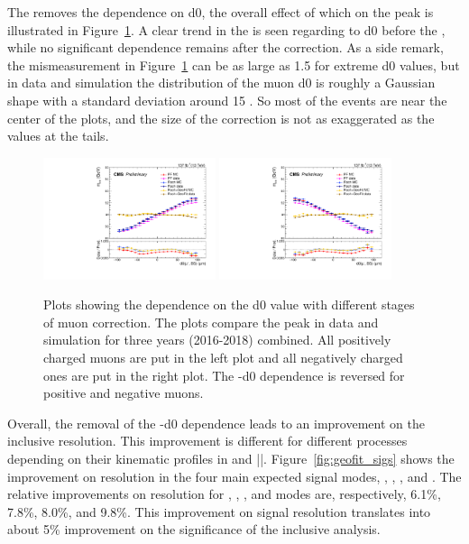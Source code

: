 The \GeoFit removes the \pt dependence on d0, 
the overall effect of which on the \zmm peak is illustrated in Figure~\ref{fig:mucal_d0_run2}.
A clear trend in the \mmm is seen regarding to d0 before the \GeoFit, 
while no significant dependence remains after the correction.
As a side remark, the \mmm mismeasurement in Figure~\ref{fig:mucal_d0_run2} can be as large as 1.5 \GeV for extreme d0 values,
but in data and simulation the distribution of the muon d0 is roughly a Gaussian shape with a standard deviation around 15 \mum.
So most of the events are near the center of the plots, and the size of the correction is not as exaggerated as the values at the tails. 

\begin{figure}[!htb]
      \centering
      \captionsetup{justification=justified}
      \includegraphics[width=0.45\textwidth]{pics/muon_corr/GeoFit/performance/muP_d0_summary_mean.pdf}
      \includegraphics[width=0.45\textwidth]{pics/muon_corr/GeoFit/performance/muN_d0_summary_mean.pdf}
      \caption{Plots showing the \pt dependence on the d0 value with different stages of muon correction.
               The plots compare the \zmm peak in data and simulation for three years (2016-2018) combined.
               All positively charged muons are put in the left plot and all negatively charged ones are put in the right plot.
               The \pt-d0 dependence is reversed for positive and negative muons.
               }
      \label{fig:mucal_d0_run2}
\end{figure}

Overall, the removal of the \pt-d0 dependence leads to an improvement on the inclusive \mmm resolution.
This improvement is different for different processes depending on their kinematic profiles in \pt and |\eta|.
Figure~\ref{fig:geofit_sigs} shows the improvement on \mmm resolution in the four main expected signal modes, \ggH, \qqH, \VH, and \ttH.
The relative improvements on \mmm resolution for \ggH, \qqH, \VH, and \ttH modes are, 
respectively, 6.1\%, 7.8\%, 8.0\%, and 9.8\%.
This improvement on signal resolution translates into about 5\% improvement on the significance of the inclusive \hmm analysis.

